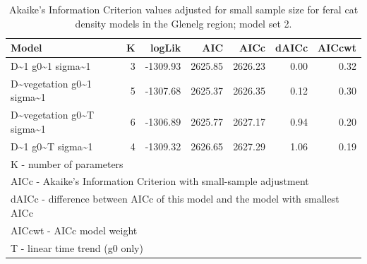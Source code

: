 \documentclass[]{elsarticle} %
\begin{document}
\begin{longtable}[t]{lrrrrrr}
\caption{\label{tab:density-aic-g-2}Akaike's Information Criterion values adjusted for small sample size for feral cat density models in the Glenelg region; model set 2.}\\
\toprule
Model & K & logLik & AIC & AICc & dAICc & AICcwt\\
\midrule
D\textasciitilde{}1 g0\textasciitilde{}1 sigma\textasciitilde{}1 & 3 & -1309.93 & 2625.85 & 2626.23 & 0.00 & 0.32\\
D\textasciitilde{}vegetation g0\textasciitilde{}1 sigma\textasciitilde{}1 & 5 & -1307.68 & 2625.37 & 2626.35 & 0.12 & 0.30\\
D\textasciitilde{}vegetation g0\textasciitilde{}T sigma\textasciitilde{}1 & 6 & -1306.89 & 2625.77 & 2627.17 & 0.94 & 0.20\\
D\textasciitilde{}1 g0\textasciitilde{}T sigma\textasciitilde{}1 & 4 & -1309.32 & 2626.65 & 2627.29 & 1.06 & 0.19\\
\bottomrule
\multicolumn{7}{l}{\rule{0pt}{1em}K - number of parameters}\\
\multicolumn{7}{l}{\rule{0pt}{1em}AICc - Akaike's Information Criterion with small-sample adjustment}\\
\multicolumn{7}{l}{\rule{0pt}{1em}dAICc - difference between AICc of this model and the model with smallest AICc}\\
\multicolumn{7}{l}{\rule{0pt}{1em}AICcwt - AICc model weight}\\
\multicolumn{7}{l}{\rule{0pt}{1em}T - linear time trend (g0 only)}\\
\end{longtable}
\endgroup{}

\newpage

\begingroup\fontsize{10}{12}\selectfont
\end{document}
